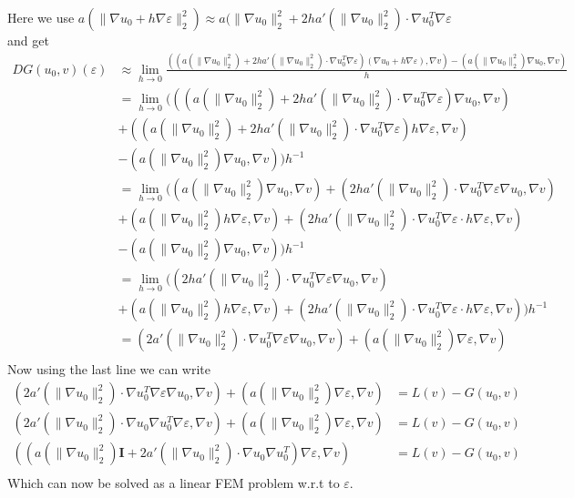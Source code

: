 \documentclass[a4paper]{article}
\begin{document}
Here we use $a(\|\nabla u_0+h\nabla \varepsilon\|_2^2)\approx a(\|\nabla u_0\|_2^2+2ha'(\|\nabla u_0\|_2^2)\cdot \nabla u_0^T\nabla \varepsilon$ and get
\begin{align*}
DG(u_0,v)(\varepsilon) &\approx \lim_{h\rightarrow 0} \frac{\left( (a\left(\|\nabla u_0 \|_2^2\right)+2ha'(\|\nabla u_0\|_2^2)\cdot \nabla u_0^T\nabla \varepsilon) \left(\nabla u_0+h\nabla \varepsilon\right),\nabla v\right) - \left(a\left(\|\nabla u_0\|_2^2\right) \nabla u_0 ,\nabla v\right)}{h} \\
%
&= \lim_{h\rightarrow 0} \Big(
\left( (a\left(\|\nabla u_0 \|_2^2\right)+2ha'(\|\nabla u_0\|_2^2)\cdot \nabla u_0^T\nabla \varepsilon) \nabla u_0,\nabla v\right) \\
&+\left( (a\left(\|\nabla u_0 \|_2^2\right)+2ha'(\|\nabla u_0\|_2^2)\cdot \nabla u_0^T\nabla \varepsilon) h\nabla \varepsilon,\nabla v\right) \\
&- \left(a\left(\|\nabla u_0\|_2^2\right) \nabla u_0 ,\nabla v\right)
\Big)h^{-1} \\
%
&= \lim_{h\rightarrow 0} \Big(
\left( a\left(\|\nabla u_0 \|_2^2\right) \nabla u_0,\nabla v\right)
+\left( 2ha'(\|\nabla u_0\|_2^2)\cdot \nabla u_0^T\nabla \varepsilon \nabla u_0,\nabla v\right) \\
&+\left( a\left(\|\nabla u_0 \|_2^2\right) h\nabla \varepsilon,\nabla v\right) 
+\left( 2ha'(\|\nabla u_0\|_2^2)\cdot \nabla u_0^T\nabla \varepsilon \cdot h\nabla\varepsilon,\nabla v\right) \\
&- \left(a\left(\|\nabla u_0\|_2^2\right) \nabla u_0 ,\nabla v\right)\Big)h^{-1} \\
&= \lim_{h\rightarrow 0} \Big(
\left( 2ha'(\|\nabla u_0\|_2^2)\cdot \nabla u_0^T\nabla \varepsilon \nabla u_0,\nabla v\right) \\
&+\left( a\left(\|\nabla u_0 \|_2^2\right) h\nabla \varepsilon,\nabla v\right) 
+\left( 2ha'(\|\nabla u_0\|_2^2)\cdot \nabla u_0^T\nabla \varepsilon \cdot h\nabla\varepsilon,\nabla v\right)\Big)h^{-1} \\
&= 
\left( 2a'(\|\nabla u_0\|_2^2)\cdot \nabla u_0^T\nabla \varepsilon \nabla u_0,\nabla v\right) 
+\left( a\left(\|\nabla u_0 \|_2^2\right) \nabla \varepsilon,\nabla v\right)  \\
\end{align*}
Now using the last line we can write
\begin{align*}
\left( 2a'(\|\nabla u_0\|_2^2)\cdot \nabla u_0^T\nabla \varepsilon \nabla u_0,\nabla v\right) 
+\left( a\left(\|\nabla u_0 \|_2^2\right) \nabla \varepsilon,\nabla v\right)  &= L(v)-G(u_0,v) \\
\left( 2a'(\|\nabla u_0\|_2^2)\cdot \nabla u_0 \nabla u_0^T\nabla \varepsilon,\nabla v\right) 
+\left( a\left(\|\nabla u_0 \|_2^2\right) \nabla \varepsilon,\nabla v\right)  &= L(v)-G(u_0,v) \\
\left( \left(a\left(\|\nabla u_0 \|_2^2\right)\mathbf{I}+2a'(\|\nabla u_0\|_2^2)\cdot \nabla u_0 \nabla u_0^T\right)\nabla \varepsilon,\nabla v\right) &= L(v)-G(u_0,v) \\
\end{align*}
Which can now be solved as a linear FEM problem w.r.t to $\varepsilon$.


\clearpage
%
\end{document}
